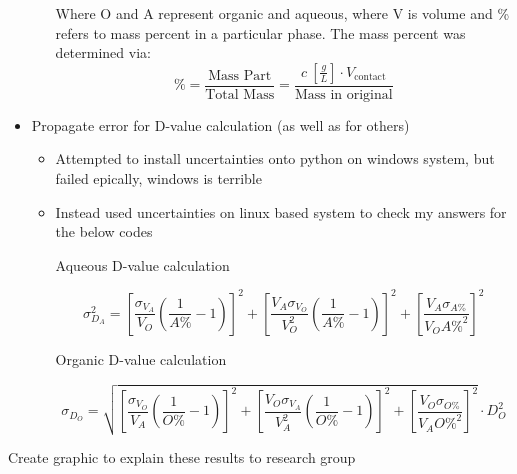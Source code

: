 \documentclass[idxtotoc,hyperref,openany,oneside]{labbook} %
\newcommand{\cmark}{\ding{51}}%
\newcommand{\done}{\rlap{$\square$}{\raisebox{2pt}{\large\hspace{1pt}\cmark}}%
  \hspace{-2.5pt}}
\begin{document}
\begin{todolist}
\begin{itemize}
\begin{itemize}
      Where O and A represent organic and aqueous, where
      V is volume and \% refers to mass percent in a
      particular phase.
      The mass percent was determined via:
      \begin{equation*}
        \%=\frac{\text{Mass Part}}{\text{Total Mass}}=
        \frac{c\ \left[\frac{g}{L}\right]\cdot V_{\text{contact}}}
        {\text{Mass in original}}
      \end{equation*}
    \end{itemize}
  \item{Propagate error for D-value calculation (as well as for others)}
    \begin{itemize}
    \item{Attempted to install uncertainties onto python
      on windows system, but failed epically, windows is terrible}
    \item{Instead used uncertainties on linux based system to check
      my answers for the below codes}
      \begin{center}
        Aqueous D-value calculation
      \end{center}
      \begin{equation*}
        \sigma_{D_A}^2=\left[\frac{ \sigma_{V_A} }{V_O}
          \left(\frac{1}{A\%}-1\right)
          \right]^2+\left[\frac{V_A\sigma_{V_O}}{V_O^2}
          \left(\frac{1}{A\%}-1\right)
          \right]^2+\left[\frac{V_A\sigma_{A\%}}{V_OA\%^2}\right]^2
      \end{equation*}
      \begin{center}
        Organic D-value calculation
      \end{center}
      \begin{equation*}
        \sigma_{D_O}=\sqrt{
          \left[\frac{ \sigma_{V_O} }{V_A}
          \left(\frac{1}{O\%}-1\right)
          \right]^2+\left[\frac{V_O\sigma_{V_A}}{V_A^2}
          \left(\frac{1}{O\%}-1\right)
          \right]^2+\left[\frac{V_O\sigma_{O\%}}{V_AO\%^2}\right]^2
          }\cdot D_O^2
      \end{equation*}
    \end{itemize}
  \end{itemize}
\item[\done]{Create graphic to explain these results to
  research group}
\end{todolist}
\end{document}
